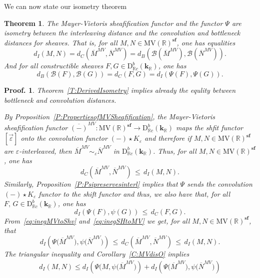 \documentclass[a4paper, english, 11pt]{article}
\newcommand{\kk}[0]{\textbf{k}}
\newcommand{\0}{\vec{0}}
\newcommand{\R}[0]{\mathbb{R}}
\newcommand{\D}[0]{\text{D}}
\newcommand{\s}{\textbf{sf}}
\newtheorem*{pf}{Proof.} }
\newtheorem{thm}[prop]{Theorem}
\begin{document}
We can now state our isometry theorem
\begin{thm} The Mayer-Vietoris sheafification functor and the functor $\Psi$ are isometry between the interleaving distance and the convolution and bottleneck distances for sheaves. That is, for all $M, N \in \mbox{MV}(\R)^\s$,  one has equalities 
$$d_I(M, N) = d_C (\overline{M}^{MV}, \overline{N}^{MV}) = d_B(\mathcal{B}(\overline{M}^{MV}), \mathcal{B}(\overline{N}^{MV})). $$ 
And for all constructible sheaves $F, G \in \D^b_{\R c}(\kk_\R)$, one has 
$$ d_B(\mathcal{B}(F), \mathcal{B}(G)) = d_C(F,G) =d_I(\Psi(F), \Psi(G)).$$
\end{thm}
\begin{pf}Theorem~\ref{T:DerivedIsometry} implies already the equlity between bottleneck and convolution distances. 

 By Proposition~\ref{P:PropertiesofMVSheafification}, the Mayer-Vietoris sheafification functor $\overline{(-)}^{MV}:  \mbox{MV}(\R)^\s\to \D^b_{\R c}(\kk_\R)$ maps the shfit functor $[\vec{\varepsilon}]$ onto the convolution functor $(-)\star K_{\varepsilon}$  and therefore if  $M, N \in \mbox{MV}(\R)^\s$ are $\varepsilon$-interleaved, then $\overline{M}^{MV} \sim_{\varepsilon} \overline{N}^{MV}$ in $ \D^b_{\R c}(\kk_\R)$. Thus,  for all $M, N \in \mbox{MV}(\R)^\s$,  one has 
 \begin{equation}
  \label{eq:inegMVtoShv}  d_C (\overline{M}^{MV}, \overline{N}^{MV}) \, \leqslant \, d_I(M, N).
 \end{equation}
Similarly,  Proposition~\ref{P:Psipreservesinterl} implies that $\Psi$ sends the convolution  $(-)\star K_{\varepsilon}$ functor to the shift functor and thus, we also have that, for all $F,\, G\in  \D^b_{\R c}(\kk_\R)$, one has  
\begin{equation}
  \label{eq:inegSHtoMV} d_I(\Psi(F), \psi(G)) \, \leqslant \, d_C (F, G). 
 \end{equation}
 From~\eqref{eq:inegMVtoShv} and~\eqref{eq:inegSHtoMV} we get, for all $M, N \in \mbox{MV}(\R)^\s$, that
 \begin{equation}\label{ineq:chained}
  d_I(\Psi\big(\overline{M}^{MV} \big), \psi\big(\overline{N}^{MV} \big)) \, \leqslant \,
  d_C (\overline{M}^{MV}, \overline{N}^{MV})
  \, \leqslant \, d_I(M, N).
 \end{equation}
The triangular inequality and Corollary~\ref{C:MVdisO} implies
\begin{multline}\label{ineq:Icomposed}
 d_I(M,N) \leqslant  d_I(\Psi\big(M, \psi\big(\overline{M}^{MV} \big))
+ d_I(\Psi\big(\overline{M}^{MV} \big), \psi\big(\overline{N}^{MV} \big)) 

\end{multline}
\end{pf}
\end{document}
